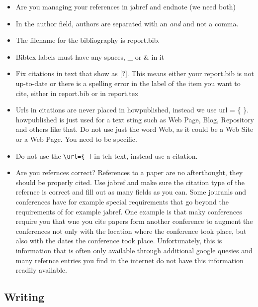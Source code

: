 \begin{itemize}[label=$\Box$]
  \item Are you managing your references in jabref and endnote (we need
    both)
  \item In the author field, authors are separated with an \textit{and}
    and not a comma.
  \item The filename for the bibliography is report.bib.
  \item Bibtex labels must have any spaces, \_ or \& in it
  \item Fix citations in text that show as [?]. This means either your
    report.bib is not up-to-date or there is a spelling error in the
    label of the item you want to cite, either in report.bib or in
    report.tex
  \item Urls in citations are never placed in howpublished, instead we
    use url = \{ \}. howpublished is just used for a text sting such
    as Web Page, Blog, Repository and others like that. Do not use
    just the word Web, as it could be a Web Site or a Web Page. You
    need to be specific.
  \item Do not use the \verb|\url={ ]| in teh text, instead use a
      citation.
    \item Are you refernces correct? References to a paper are no
      afterthought, they should be properly cited. Use jabref and make
      sure the citation type of the refernce is correct and fill out
      as many fields as you can. Some jouranls and conferences have
      for example special requirements that go beyond the requirements
      of for example jabref. One example is that maky conferences
      require you that wne you cite papers form another conference to
      augment the conferences not only with the location where the
      conference took place, but also with the dates the conference
      took place. Unfortunately, this is information that is often
      only available through additional google quesies and many
      refernce entries you find in the internet do not have this
      information readily available.
\end{itemize}

\subsection{Writing}

